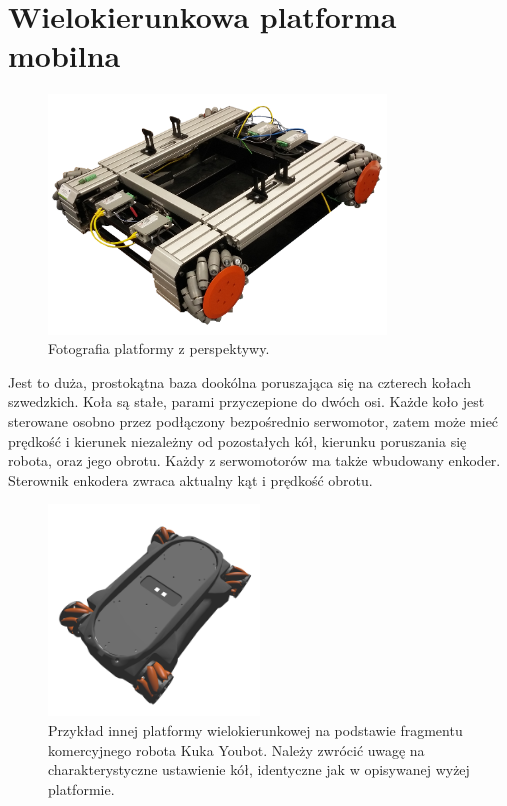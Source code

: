 \section{Wielokierunkowa platforma mobilna}
\begin{figure}[H]
\centering
 \includegraphics[width=0.8\textwidth]{graphics/base_photo.png}
\caption{Fotografia platformy z perspektywy.}
\end{figure} 

Jest to duża, prostokątna baza dookólna poruszająca się na czterech kołach szwedzkich.
Koła są stałe, parami przyczepione do dwóch osi.
Każde koło jest sterowane osobno przez podłączony bezpośrednio serwomotor, zatem może mieć prędkość i kierunek niezależny od pozostałych kół, kierunku poruszania się robota, oraz jego obrotu.
Każdy z serwomotorów ma także wbudowany enkoder.
Sterownik enkodera zwraca aktualny kąt i prędkość obrotu.

\begin{figure}[H]
\centering
 \includegraphics[width=0.5\textwidth]{graphics/kuka_youbot.png}
\caption{Przykład innej platformy wielokierunkowej na podstawie fragmentu komercyjnego robota Kuka Youbot. Należy zwrócić uwagę na charakterystyczne ustawienie kół, identyczne jak w opisywanej wyżej platformie.}
\end{figure} 

